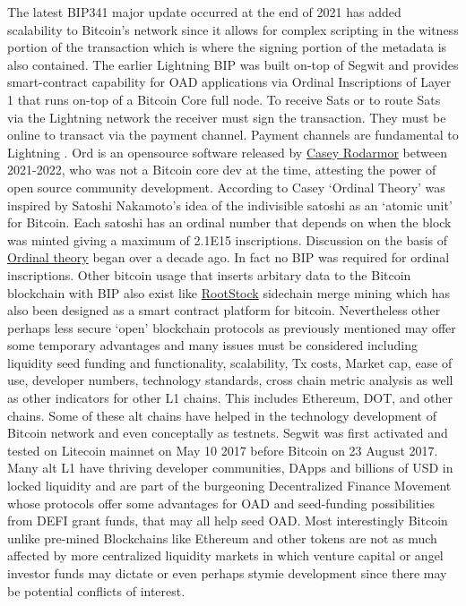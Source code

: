 \documentclass[final,5p,times,twocolumn,authoryear]{elsarticle}
\begin{document}
The latest BIP341 major update occurred at the end of 2021 has added scalability to Bitcoin's network since it allows for complex scripting in the witness portion of the transaction which is where the signing portion of the metadata is also contained. The earlier Lightning BIP was built on-top of Segwit and provides smart-contract capability for OAD applications via Ordinal Inscriptions of Layer 1 that runs on-top of a Bitcoin Core full node. To receive Sats or to route Sats via the Lightning network the receiver must sign the transaction. They must be online to transact via the payment channel. Payment channels are fundamental to Lightning .  Ord is an opensource software released by \href{https://github.com/casey/ord}{Casey Rodarmor} between 2021-2022, who was not a Bitcoin core dev at the time, attesting the power of open source community development. According to Casey `Ordinal Theory' was inspired by Satoshi Nakamoto's idea of the indivisible satoshi as an `atomic unit' for Bitcoin. Each satoshi has an ordinal number that depends on when the block was minted giving a maximum of 2.1E15 inscriptions. Discussion on the basis of \href{https://bitcointalk.org/index.php?topic=117224.0}{Ordinal theory} began over a decade ago. In fact no BIP was required for ordinal inscriptions. Other bitcoin usage that inserts arbitary data to the Bitcoin blockchain with BIP also exist like \href{https://dev.rootstock.io/rsk/}{RootStock} sidechain merge mining which has also been designed as a smart contract platform for bitcoin. Nevertheless other perhaps less secure `open' blockchain protocols as previously mentioned may offer some temporary advantages and many issues must be considered including liquidity seed funding and functionality, scalability, Tx costs, Market cap, ease of use, developer numbers, technology standards, cross chain metric analysis as well as other indicators for other L1 chains. This includes Ethereum, DOT, and other chains. Some of these alt chains have helped in the technology development of Bitcoin network and even conceptally as testnets. Segwit was first activated and tested on Litecoin mainnet on May 10 2017 before Bitcoin on 23 August 2017. Many alt L1 have thriving developer communities, DApps and billions of USD in locked liquidity and are part of the burgeoning Decentralized Finance Movement whose protocols offer some advantages for OAD and seed-funding possibilities from DEFI grant funds, that may all help seed OAD. Most interestingly Bitcoin unlike pre-mined Blockchains like Ethereum and other tokens are not as much affected by more centralized liquidity markets in which venture capital or angel investor funds may dictate or even perhaps stymie development since there may be potential conflicts of interest. 
\end{document}
